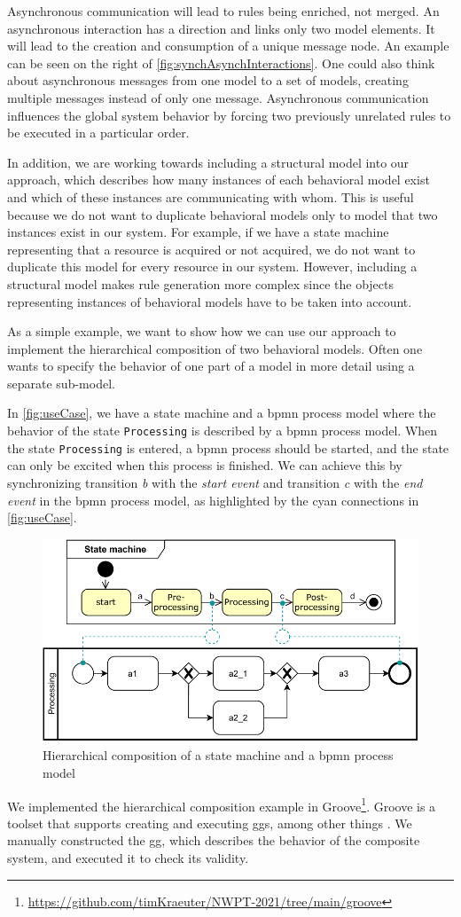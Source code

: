 \documentclass[a4paper]{easychair}
\begin{document}
Asynchronous communication will lead to rules being enriched, not merged.
An asynchronous interaction has a direction and links only two model elements.
It will lead to the creation and consumption of a unique message node.
An example can be seen on the right of \autoref{fig:synchAsynchInteractions}. 
One could also think about asynchronous messages from one model to a set of models, creating multiple messages instead of only one message.
Asynchronous communication influences the global system behavior by forcing two previously unrelated rules to be executed in a particular order.

In addition, we are working towards including a structural model into our approach, which describes how many instances of each behavioral model exist and which of these instances are communicating with whom.
This is useful because we do not want to duplicate behavioral models only to model that two instances exist in our system.
For example, if we have a state machine representing that a resource is acquired or not acquired, we do not want to duplicate this model for every resource in our system.
However, including a structural model makes rule generation more complex since the objects representing instances of behavioral models have to be taken into account.

As a simple example, we want to show how we can use our approach to implement the hierarchical composition of two behavioral models.
Often one wants to specify the behavior of one part of a model in more detail using a separate sub-model.

In \autoref{fig:useCase}, we have a state machine and a \gls*{bpmn} process model where the behavior of the state \texttt{Processing} is described by a \gls*{bpmn} process model.
When the state \texttt{Processing} is entered, a \gls*{bpmn} process should be started, and the state can only be excited when this process is finished.
We can achieve this by synchronizing transition \textit{b} with the \textit{start event} and transition \textit{c} with the \textit{end event} in the \gls*{bpmn} process model, as highlighted by the cyan connections in \autoref{fig:useCase}.

\begin{figure}[h]
    \centering
    \includegraphics[width=.5\textwidth]{images/usecase.pdf}
    \caption{Hierarchical composition of a state machine and a \gls*{bpmn} process model}
    \label{fig:useCase}
\end{figure}
We implemented the hierarchical composition example in Groove\footnote{\url{https://github.com/timKraeuter/NWPT-2021/tree/main/groove}}.
Groove is a toolset that supports creating and executing \glspl*{gg}, among other things \cite{ghamarianModellingAnalysisUsing2012, rensinkGROOVESimulatorTool2004}.
We manually constructed the \gls*{gg}, which describes the behavior of the composite system, and executed it to check its validity.
\end{document}
